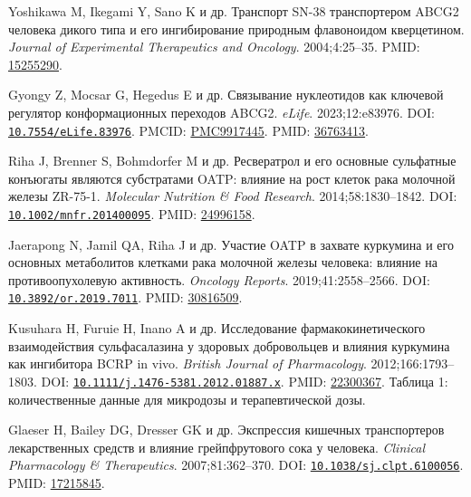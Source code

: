 \documentclass[11pt]{article}
\begin{document}
\begin{description}[before={\microtypesetup{expansion=false}\setlength{\RaggedRightRightskip}{0pt plus 4em}\RaggedRight}]
\item[{[91]}] Yoshikawa M, Ikegami Y, Sano K и др. Транспорт SN-38 транспортером ABCG2 человека дикого типа и его ингибирование природным флавоноидом кверцетином. \textit{\foreignlanguage{english}{Journal of Experimental Therapeutics and Oncology}}. 2004;4:25--35. PMID: \href{https://pubmed.ncbi.nlm.nih.gov/15255290/}{15255290}.
\item[{[92]}] Gyongy Z, Mocsar G, Hegedus E и др. Связывание нуклеотидов как ключевой регулятор конформационных переходов ABCG2. \textit{\foreignlanguage{english}{eLife}}. 2023;12:e83976. DOI: \href{https://doi.org/10.7554/eLife.83976}{\nolinkurl{10.7554/eLife.83976}}. PMCID: \href{https://pmc.ncbi.nlm.nih.gov/articles/PMC9917445/}{PMC9917445}. PMID: \href{https://pubmed.ncbi.nlm.nih.gov/36763413/}{36763413}.
\item[{[93]}] Riha J, Brenner S, Bohmdorfer M и др. Ресвератрол и его основные сульфатные конъюгаты являются субстратами OATP: влияние на рост клеток рака молочной железы ZR-75-1. \textit{\foreignlanguage{english}{Molecular Nutrition \& Food Research}}. 2014;58:1830--1842. DOI: \href{https://doi.org/10.1002/mnfr.201400095}{\nolinkurl{10.1002/mnfr.201400095}}. PMID: \href{https://pubmed.ncbi.nlm.nih.gov/24996158/}{24996158}.
\item[{[94]}] Jaerapong N, Jamil QA, Riha J и др. Участие OATP в захвате куркумина и его основных метаболитов клетками рака молочной железы человека: влияние на противоопухолевую активность. \textit{\foreignlanguage{english}{Oncology Reports}}. 2019;41:2558--2566. DOI: \href{https://doi.org/10.3892/or.2019.7011}{\nolinkurl{10.3892/or.2019.7011}}. PMID: \href{https://pubmed.ncbi.nlm.nih.gov/30816509/}{30816509}.
\item[{[95]}] Kusuhara H, Furuie H, Inano A и др. Исследование фармакокинетического взаимодействия сульфасалазина у здоровых добровольцев и влияния куркумина как ингибитора BCRP in vivo. \textit{\foreignlanguage{english}{British Journal of Pharmacology}}. 2012;166:1793--1803. DOI: \href{https://doi.org/10.1111/j.1476-5381.2012.01887.x}{\nolinkurl{10.1111/j.1476-5381.2012.01887.x}}. PMID: \href{https://pubmed.ncbi.nlm.nih.gov/22300367/}{22300367}. Таблица 1: количественные данные для микродозы и терапевтической дозы.
\item[{[96]}] Glaeser H, Bailey DG, Dresser GK и др. Экспрессия кишечных транспортеров лекарственных средств и влияние грейпфрутового сока у человека. \textit{\foreignlanguage{english}{Clinical Pharmacology \& Therapeutics}}. 2007;81:362--370. DOI: \href{https://doi.org/10.1038/sj.clpt.6100056}{\nolinkurl{10.1038/sj.clpt.6100056}}. PMID: \href{https://pubmed.ncbi.nlm.nih.gov/17215845/}{17215845}.

\end{description}
\end{document}
